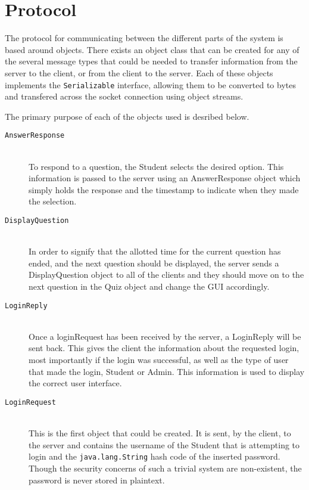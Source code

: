 \section{Protocol}
\label{sec:protocol}

The protocol for communicating between the different parts of the system is
based around objects. There exists an object class that can be created for any
of the several message types that could be needed to transfer information from
the server to the client, or from the client to the server. Each of these
objects implements the \texttt{Serializable} interface, allowing them to be
converted to bytes and transfered across the socket connection using object
streams.

The primary purpose of each of the objects used is desribed below.

\begin{description}

	\item[\texttt{AnswerResponse}] \hfill \\ To respond to a question, the
		Student selects the desired option. This information is passed to the
		server using an AnswerResponse object which simply holds the response
		and the timestamp to indicate when they made the selection.

	\item[\texttt{DisplayQuestion}] \hfill \\ In order to signify that the
		allotted time for the current question has ended, and the next question
		should be displayed, the server sends a DisplayQuestion object to all
		of the clients and they should move on to the next question in the Quiz
		object and change the GUI accordingly.

	\item[\texttt{LoginReply}] \hfill \\ Once a loginRequest has been received
		by the server, a LoginReply will be sent back. This gives the client
		the information about the requested login, most importantly if the
		login was successful, as well as the type of user that made the login,
		Student or Admin. This information is used to display the correct user
		interface.

	\item[\texttt{LoginRequest}] \hfill \\ This is the first object that could
		be created.  It is sent, by the client, to the server and contains the
		username of the Student that is attempting to login and the
		\texttt{java.lang.String} hash code of the inserted password. Though
		the security concerns of such a trivial system are non-existent, the
		password is never stored in plaintext.


\end{description}
